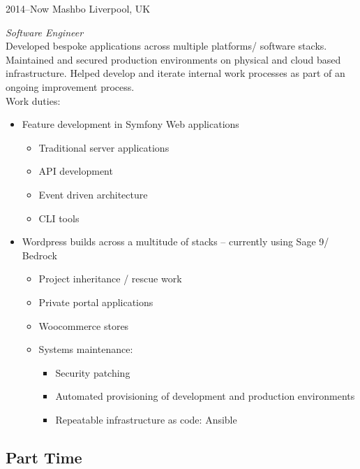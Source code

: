 \documentclass[]{friggeri-cv} %
\begin{document}
\begin{entrylist}


\entry
{2014--Now}
{Mashbo}
{Liverpool, UK}
{\emph{Software Engineer} \\
Developed bespoke applications across multiple platforms/ software stacks.  
Maintained and secured production environments on physical and cloud based infrastructure.
Helped develop and iterate internal work processes as part of an ongoing improvement process.\\
Work duties:
\begin{itemize}
\item Feature development in Symfony Web applications
\begin{itemize}
\item Traditional server applications
\item API development
\item Event driven architecture
\item CLI tools
\end{itemize}
\item Wordpress builds across a multitude of stacks -- currently using Sage 9/ Bedrock
\begin{itemize}
\item Project inheritance / rescue work
\item Private portal applications
\item Woocommerce stores
\item Systems maintenance:
\begin{itemize}
\item Security patching
\item Automated provisioning of development and production environments
\item Repeatable infrastructure as code: Ansible
\end{itemize}
\end{itemize}
\end{itemize}}


\end{entrylist}

\subsection{Part Time}
\end{document}

